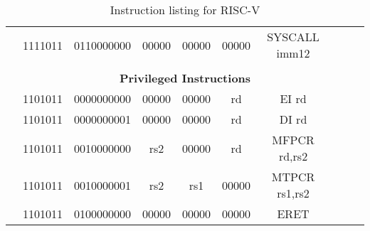 \begin{table}[p]
\begin{small}
\begin{center}
\begin{tabular}{rcccccccccccl}
&
\multicolumn{1}{|c|}{1111011} &
\multicolumn{4}{c|}{0110000000} &
\multicolumn{1}{c|}{00000} &
\multicolumn{1}{c|}{00000} &
\multicolumn{1}{c|}{00000} & SYSCALL imm12 \\
\cline{2-9}
  

&
\multicolumn{11}{c}{} & \\
&
\multicolumn{11}{c}{\bf Privileged Instructions} & \\
\cline{2-9}
  

&
\multicolumn{1}{|c|}{1101011} &
\multicolumn{4}{c|}{0000000000} &
\multicolumn{1}{c|}{00000} &
\multicolumn{1}{c|}{00000} &
\multicolumn{1}{c|}{rd} & EI rd \\
\cline{2-9}
  

&
\multicolumn{1}{|c|}{1101011} &
\multicolumn{4}{c|}{0000000001} &
\multicolumn{1}{c|}{00000} &
\multicolumn{1}{c|}{00000} &
\multicolumn{1}{c|}{rd} & DI rd \\
\cline{2-9}
  

&
\multicolumn{1}{|c|}{1101011} &
\multicolumn{4}{c|}{0010000000} &
\multicolumn{1}{c|}{rs2} &
\multicolumn{1}{c|}{00000} &
\multicolumn{1}{c|}{rd} & MFPCR rd,rs2 \\
\cline{2-9}
  

&
\multicolumn{1}{|c|}{1101011} &
\multicolumn{4}{c|}{0010000001} &
\multicolumn{1}{c|}{rs2} &
\multicolumn{1}{c|}{rs1} &
\multicolumn{1}{c|}{00000} & MTPCR rs1,rs2 \\
\cline{2-9}
  

&
\multicolumn{1}{|c|}{1101011} &
\multicolumn{4}{c|}{0100000000} &
\multicolumn{1}{c|}{00000} &
\multicolumn{1}{c|}{00000} &
\multicolumn{1}{c|}{00000} & ERET  \\
\cline{2-9}
  

\end{tabular}
\end{center}
\end{small}
\caption{Instruction listing for RISC-V}
\label{instr-table}
\end{table}
  
